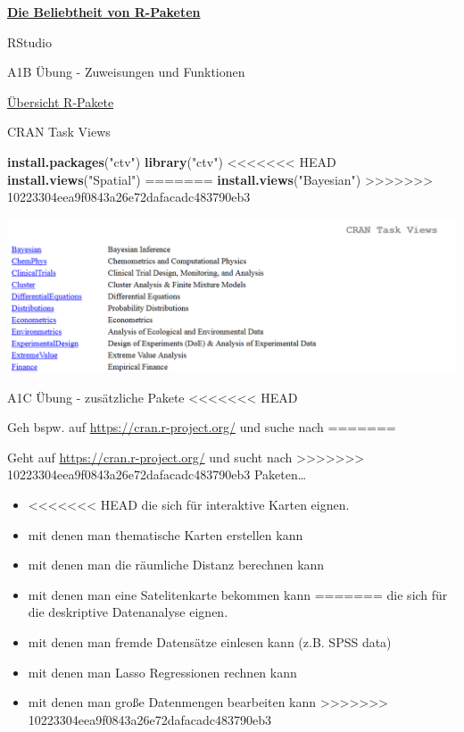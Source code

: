 \documentclass[ignorenonframetext,]{beamer}
\newenvironment{Shaded}{\begin{snugshade}}{\end{snugshade}}
\newcommand{\KeywordTok}[1]{\textcolor[rgb]{0.13,0.29,0.53}{\textbf{#1}}}
\newcommand{\StringTok}[1]{\textcolor[rgb]{0.31,0.60,0.02}{#1}}
\newcommand{\NormalTok}[1]{#1}
\newcommand{\KeywordTok}[1]{\textcolor[rgb]{0.13,0.29,0.53}{\textbf{#1}}}
\newcommand{\NormalTok}[1]{#1}
\newcommand{\StringTok}[1]{\textcolor[rgb]{0.31,0.60,0.02}{#1}}
\providecommand{\tightlist}{%
  \setlength{\itemsep}{0pt}\setlength{\parskip}{0pt}}
\begin{document}
\begin{frame}{\href{https://gallery.shinyapps.io/cran-gauge/}{\textbf{Die
Beliebtheit von R-Paketen}}}
\begin{frame}{RStudio}
\begin{frame}[fragile]{A1B Übung - Zuweisungen und Funktionen}
\begin{frame}{\href{https://www.youtube.com/watch?v=kKI9--Opmso}{Übersicht
R-Pakete}}
\begin{frame}[fragile]{CRAN Task Views}
\begin{Shaded}
\begin{Highlighting}[]
\KeywordTok{install.packages}\NormalTok{(}\StringTok{"ctv"}\NormalTok{)}
\KeywordTok{library}\NormalTok{(}\StringTok{"ctv"}\NormalTok{)}
<<<<<<< HEAD
\KeywordTok{install.views}\NormalTok{(}\StringTok{"Spatial"}\NormalTok{)}
=======
\KeywordTok{install.views}\NormalTok{(}\StringTok{"Bayesian"}\NormalTok{)}
>>>>>>> 10223304eea9f0843a26e72dafacadc483790eb3
\end{Highlighting}
\end{Shaded}

\includegraphics{figure/CRANtaskViews.PNG}

\end{frame}

\begin{frame}{A1C Übung - zusätzliche Pakete}
<<<<<<< HEAD

Geh bspw. auf \url{https://cran.r-project.org/} und suche nach
=======
\protect\hypertarget{a1c-ubung---zusatzliche-pakete}{}

Geht auf \url{https://cran.r-project.org/} und sucht nach
>>>>>>> 10223304eea9f0843a26e72dafacadc483790eb3
Paketen\ldots{}

\begin{itemize}
\tightlist
\item
<<<<<<< HEAD
  die sich für interaktive Karten eignen.
\item
  mit denen man thematische Karten erstellen kann
\item
  mit denen man die räumliche Distanz berechnen kann
\item
  mit denen man eine Satelitenkarte bekommen kann
=======
  die sich für die deskriptive Datenanalyse eignen.
\item
  mit denen man fremde Datensätze einlesen kann (z.B. SPSS data)
\item
  mit denen man Lasso Regressionen rechnen kann
\item
  mit denen man große Datenmengen bearbeiten kann
>>>>>>> 10223304eea9f0843a26e72dafacadc483790eb3
\end{itemize}


\end{frame}
\end{frame}
\end{frame}
\end{frame}
\end{frame}
\end{document}
